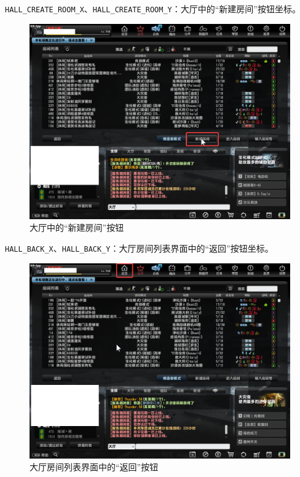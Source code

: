\lstinline{HALL_CREATE_ROOM_X}、\lstinline{HALL_CREATE_ROOM_Y}：大厅中的“新建房间”按钮坐标。

\begin{figure}[H]
    \Centering
    \includegraphics[width=\textwidth]{docs/assets/create_room_0}
    \caption{大厅中的“新建房间”按钮}
\end{figure}

\lstinline{HALL_BACK_X}、\lstinline{HALL_BACK_Y}：大厅房间列表界面中的“返回”按钮坐标。

\begin{figure}[H]
    \Centering
    \includegraphics[width=\textwidth]{docs/assets/hall_back.png}
    \caption{大厅房间列表界面中的“返回”按钮}
\end{figure}

